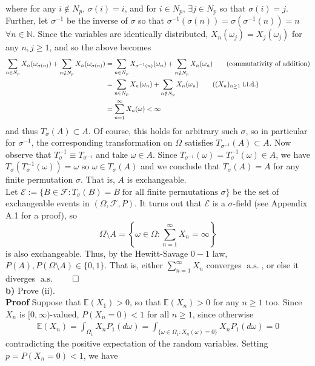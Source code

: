 \documentclass[10pt]{article}
\newcommand{\E}{\mathbb{E}}
\newcommand{\1}[1]{\mathbbm{1}_{#1}}
\newcommand{\mc}[1]{\mathcal{#1}}
\DeclareMathOperator{\as}{a.s.}
\DeclareMathOperator{\iid}{i.i.d.}
\begin{document}
    where for any $i\notin N_p$, $\sigma(i)=i$, and for $i\in N_p$, $\exists j\in N_p$ so that $\sigma(i)=j$. Further, let $\sigma^{-1}$ be the inverse of $\sigma$ so that $\sigma^{-1}(\sigma(n))=\sigma(\sigma^{-1}(n))=n$ $\forall n\in\mathbb{N}$. Since the variables are identically distributed, $X_n(\omega_j)=X_j(\omega_j)$ for any $n,j\geq 1$, and so the above becomes
    \begin{align*}
        \sum_{n\in N_p}X_n(\omega_{\sigma(n)})+\sum_{n\notin N_p}X_n(\omega_{\sigma(n)})&=\sum_{n\in N_p}X_{\sigma^{-1}(n)}(\omega_n)+\sum_{n\notin N_p}X_n(\omega_n)\tag{commutativity of addition}\\
        &=\sum_{n\in N_p}X_n(\omega_n)+\sum_{n\notin N_p}X_n(\omega_n)\tag{$(X_n)_{n\geq 1}$ $\iid$}\\
        &=\sum_{n=1}^\infty X_n(\omega)<\infty
    \end{align*}
    and thus $T_\sigma(A)\subset A$. Of course, this holds for arbitrary such $\sigma$, so in particular for $\sigma^{-1}$, the corresponding transformation on $\Omega$ satisfies $T_{\sigma^{-1}}(A)\subset A$. Now observe that $T^{-1}_\sigma\equiv T_{\sigma^{-1}}$ and take $\omega\in A$.
    Since $T_{\sigma^{-1}}(\omega)=T^{-1}_\sigma(\omega)\in A$, we have $T_{\sigma}(T^{-1}_\sigma(\omega))=\omega$ so $\omega\in T_\sigma(A)$ and we conclude that $T_\sigma(A)=A$ for any finite permutation $\sigma$. That is, $A$ is exchangeable.\\[5pt]
    Let $\mc{E}:=\{B\in\mc{F}:T_\sigma(B)=B\;\text{for all finite permutations $\sigma$}\}$ be the set of exchangeable events in $(\Omega,\mc{F},P)$. It turns out that $\mc{E}$ is a $\sigma$-field (see Appendix A.1 for a proof), so 
    \[\Omega\setminus A=\left\{\omega\in\Omega:\sum_{n=1}^\infty X_n=\infty\right\}\]
    is also exchangeable. Thus, by the Hewitt-Savage $0-1$ law, $P(A),P(\Omega\setminus A)\in\{0,1\}$. That is, either $\sum_{n=1}^\infty X_n$ converges $\as$, or else it diverges $\as$\hfill{$\qed$}\\[5pt]
    {\bf b)} Prove (ii).\\[5pt]
    {\bf Proof}\hspace{5pt} Suppose that $\E(X_1)>0$, so that $\E(X_n)>0$ for any $n\geq 1$ too. Since $X_n$ is $[0,\infty)$-valued, $P(X_n=0)<1$ for all $n\geq 1$, since otherwise
    \begin{align*}
        \E(X_n)=\int_{\Omega_1}X_nP_1(d\omega)=\int_{\{\omega\in\Omega_1:X_n(\omega)=0\}}X_nP_1(d\omega)=0
    \end{align*}
    contradicting the positive expectation of the random variables. Setting $p=P(X_n=0)<1$, we have
\end{document}
